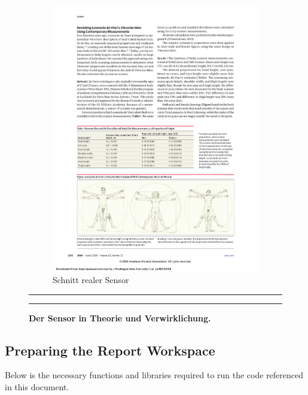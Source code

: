 \documentclass[]{article}
\begin{document}
\begin{figure}[!ht]
\begin{subfigure}[h]{0.5\textwidth}
        \includegraphics[trim = 11.25cm 0 0 0,clip,scale=1]{figures/Vitruvian.pdf}
            \caption{Schnitt realer Sensor \citep{Thomas:2020}}
        \label{fig:sub-second}
    \end{subfigure}
    \vspace{2.5mm}
    \hrule
    \vspace{2.5mm}
        \caption{\textbf{ Der Sensor in Theorie und Verwirklichung.}   }
        \label{fig:combined}
    \vspace{-2.5mm}
    \hrule
\end{figure}

\newpage

\subsection{Preparing the Report Workspace}
\label{sec:appendix-prepare-workspace}

Below is the necessary functions and libraries required to run the code
referenced in this document.
\end{document}
